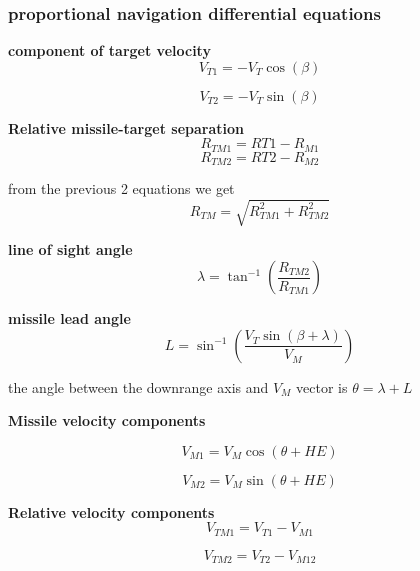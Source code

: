 \subsubsection*{proportional navigation differential equations}

\textbf{component of target velocity} 
\begin{equation}
	V_{T1} = - V_T \cos(\beta)
\end{equation}

\begin{equation}
V_{T2} = - V_T \sin(\beta)
\end{equation}

\textbf{Relative missile-target separation}
\begin{equation}
	R_{TM1} = R{T1} - R_{M1}
\end{equation}
\begin{equation}
R_{TM2} = R{T2} - R_{M2}
\end{equation}

from the previous 2 equations we get
\begin{equation}
	R_{TM} = \sqrt{R_{TM1}^2 + R_{TM2}^2}
	\label{RTM}
\end{equation}

\textbf{line of sight angle}
\begin{equation}
	\lambda = \tan^{-1} (\dfrac{R_{TM2}}{R_{TM1}})
	\label{lambda}
\end{equation}

\textbf{missile lead angle} 
\begin{equation}
	L= \sin^{-1}(\dfrac{V_T \sin(\beta + \lambda)}{V_M})
\end{equation}

the angle between the downrange axis and $V_M$ vector is $\theta = \lambda + L$

\textbf{Missile velocity components} 

\begin{equation}
	V_{M1} = V_M \cos (\theta + HE)
\end{equation}

\begin{equation}
V_{M2} = V_M \sin (\theta + HE)
\end{equation}

\textbf{Relative velocity components}
\begin{equation}
	V_{TM1} = V_{T1} - V_{M1}
\end{equation}

\begin{equation}
V_{TM2} = V_{T2} - V_{M12}
\end{equation}


